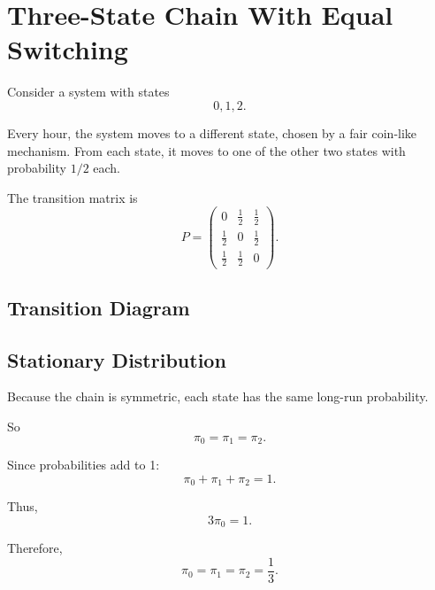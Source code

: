 \documentclass[12pt]{article}
\begin{document}
\section{Three-State Chain With Equal Switching}

Consider a system with states
\[
0,1,2.
\]

Every hour, the system moves to a different state, chosen by a fair coin-like mechanism. From each state, it moves to one of the other two states with probability \(1/2\) each.

The transition matrix is
\[
P=
\begin{pmatrix}
0 & \frac12 & \frac12\\
\frac12 & 0 & \frac12\\
\frac12 & \frac12 & 0
\end{pmatrix}.
\]

\subsection*{Transition Diagram}

\begin{center}
\end{center}

\subsection*{Stationary Distribution}

Because the chain is symmetric, each state has the same long-run probability.

So
\[
\pi_0=\pi_1=\pi_2.
\]

Since probabilities add to 1:
\[
\pi_0+\pi_1+\pi_2=1.
\]

Thus,
\[
3\pi_0=1.
\]

Therefore,
\[
\pi_0=\pi_1=\pi_2=\frac13.
\]
\end{document}

